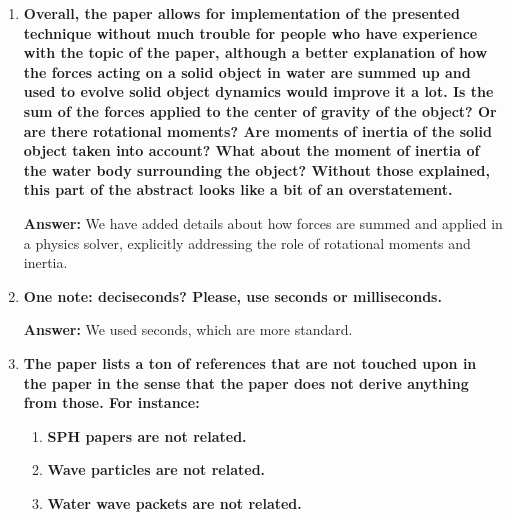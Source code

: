 \documentclass{article}
\newcommand{\answer}[1]{\textbf{\textcolor{answercolor}{Answer:}} \textcolor{answercolor}{#1}}
\begin{document}
\begin{enumerate}[label=\textbf{\arabic*.}]
\begin{enumerate}[label=\textbf{\arabic*.}]
        \item \textbf{Mask movement and orientation used in the paper, so that the front of the mask is above the water surface and the back is below the water surface, looks artificial and extremely simplified. A propulsion force acting on the hull and causing it to move, in conjunction with proper water-to-solid interaction from the first part of the paper, with its forces and moments, will naturally cause the hull to raise its bow based on a physically correct simulation instead of the oversimplified approximation used in the paper.}
        
        \answer{Thank you for your valuable proposition. It might be a nice refinement for the Arc Blanc framework.}
    \end{enumerate}

    \item \textbf{Overall, the paper allows for implementation of the presented technique without much trouble for people who have experience with the topic of the paper, although a better explanation of how the forces acting on a solid object in water are summed up and used to evolve solid object dynamics would improve it a lot. Is the sum of the forces applied to the center of gravity of the object? Or are there rotational moments? Are moments of inertia of the solid object taken into account? What about the moment of inertia of the water body surrounding the object? Without those explained, this part of the abstract looks like a bit of an overstatement.}
    
    \answer{We have added details about how forces are summed and applied in a physics solver, explicitly addressing the role of rotational moments and inertia.}

    \item \textbf{One note: deciseconds? Please, use seconds or milliseconds.}
    
    \answer{We used seconds, which are more standard.}

    \item \textbf{The paper lists a ton of references that are not touched upon in the paper in the sense that the paper does not derive anything from those. For instance:}
    
    \begin{enumerate}[label=\textbf{\arabic*.}]
        \item \textbf{SPH papers are not related.}
        \item \textbf{Wave particles are not related.}
        \item \textbf{Water wave packets are not related.}
    \end{enumerate}
    

\end{enumerate}
\end{document}
